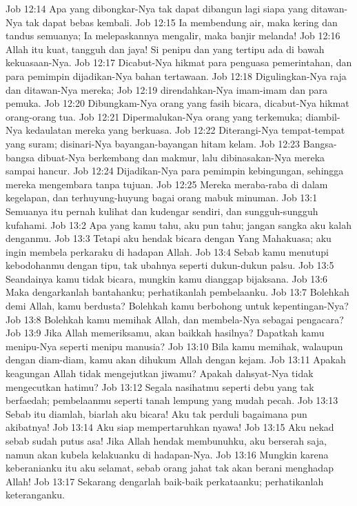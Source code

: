 Job 12:14  Apa yang dibongkar-Nya tak dapat dibangun lagi siapa yang ditawan-Nya tak dapat bebas kembali.
Job 12:15  Ia membendung air, maka kering dan tandus semuanya; Ia melepaskannya mengalir, maka banjir melanda!
Job 12:16  Allah itu kuat, tangguh dan jaya! Si penipu dan yang tertipu ada di bawah kekuasaan-Nya.
Job 12:17  Dicabut-Nya hikmat para penguasa pemerintahan, dan para pemimpin dijadikan-Nya bahan tertawaan.
Job 12:18  Digulingkan-Nya raja dan ditawan-Nya mereka;
Job 12:19  direndahkan-Nya imam-imam dan para pemuka.
Job 12:20  Dibungkam-Nya orang yang fasih bicara, dicabut-Nya hikmat orang-orang tua.
Job 12:21  Dipermalukan-Nya orang yang terkemuka; diambil-Nya kedaulatan mereka yang berkuasa.
Job 12:22  Diterangi-Nya tempat-tempat yang suram; disinari-Nya bayangan-bayangan hitam kelam.
Job 12:23  Bangsa-bangsa dibuat-Nya berkembang dan makmur, lalu dibinasakan-Nya mereka sampai hancur.
Job 12:24  Dijadikan-Nya para pemimpin kebingungan, sehingga mereka mengembara tanpa tujuan.
Job 12:25  Mereka meraba-raba di dalam kegelapan, dan terhuyung-huyung bagai orang mabuk minuman.
Job 13:1  Semuanya itu pernah kulihat dan kudengar sendiri, dan sungguh-sungguh kufahami.
Job 13:2  Apa yang kamu tahu, aku pun tahu; jangan sangka aku kalah denganmu.
Job 13:3  Tetapi aku hendak bicara dengan Yang Mahakuasa; aku ingin membela perkaraku di hadapan Allah.
Job 13:4  Sebab kamu menutupi kebodohanmu dengan tipu, tak ubahnya seperti dukun-dukun palsu.
Job 13:5  Seandainya kamu tidak bicara, mungkin kamu dianggap bijaksana.
Job 13:6  Maka dengarkanlah bantahanku; perhatikanlah pembelaanku.
Job 13:7  Bolehkah demi Allah, kamu berdusta? Bolehkah kamu berbohong untuk kepentingan-Nya?
Job 13:8  Bolehkah kamu memihak Allah, dan membela-Nya sebagai pengacara?
Job 13:9  Jika Allah memeriksamu, akan baikkah hasilnya? Dapatkah kamu menipu-Nya seperti menipu manusia?
Job 13:10  Bila kamu memihak, walaupun dengan diam-diam, kamu akan dihukum Allah dengan kejam.
Job 13:11  Apakah keagungan Allah tidak mengejutkan jiwamu? Apakah dahsyat-Nya tidak mengecutkan hatimu?
Job 13:12  Segala nasihatmu seperti debu yang tak berfaedah; pembelaanmu seperti tanah lempung yang mudah pecah.
Job 13:13  Sebab itu diamlah, biarlah aku bicara! Aku tak perduli bagaimana pun akibatnya!
Job 13:14  Aku siap mempertaruhkan nyawa!
Job 13:15  Aku nekad sebab sudah putus asa! Jika Allah hendak membunuhku, aku berserah saja, namun akan kubela kelakuanku di hadapan-Nya.
Job 13:16  Mungkin karena keberanianku itu aku selamat, sebab orang jahat tak akan berani menghadap Allah!
Job 13:17  Sekarang dengarlah baik-baik perkataanku; perhatikanlah keteranganku.
